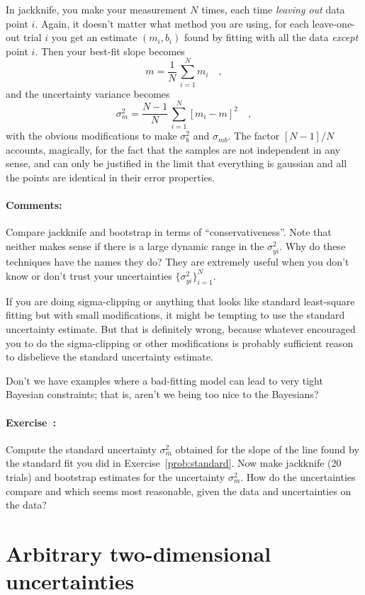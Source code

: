 \documentclass[12pt]{article}
\newcommand{\problemname}{Exercise}
\newcommand{\commentsname}{Comments}
\newcounter{problem}
\newenvironment{problem}{\paragraph{\problemname~\theproblem:}\refstepcounter{problem}}{}
\newenvironment{comments}{\paragraph{\commentsname:}}{}
\newcommand{\setofall}[3]{\{{#1}\}_{{#2}}^{{#3}}}
\newcommand{\allsigmay}{\setofall{\sigma_{yi}^2}{i=1}{N}}
\begin{document}
In jackknife, you make your measurement $N$ times, each time
\emph{leaving out} data point $i$.  Again, it doesn't matter what
method you are using, for each leave-one-out trial $i$ you get an
estimate $(m_i,b_i)$ found by fitting with all the data \emph{except}
point $i$.  Then your best-fit slope becomes
\begin{equation}
m = \frac{1}{N}\,\sum_{i=1}^N m_i \quad ,
\end{equation}
and the uncertainty variance becomes
\begin{equation}
\sigma_m^2 = \frac{N-1}{N}\,\sum_{i=1}^N [m_i-m]^2 \quad ,
\end{equation}
with the obvious modifications to make $\sigma_b^2$ and
$\sigma_{mb}$.  The factor $[N-1]/N$ accounts, magically, for the
fact that the samples are not independent in any sense, and can only
be justified in the limit that everything is gaussian and all the
points are identical in their error properties.

\begin{comments}
Compare jackknife and bootstrap in terms of ``conservativeness''.
Note that neither makes sense if there is a large dynamic range in the
$\sigma_{yi}^2$.  Why do these techniques have the names they do?
They are extremely useful when you don't know or don't trust your
uncertainties $\allsigmay$.

If you are doing sigma-clipping or anything that looks like standard
least-square fitting but with small modifications, it might be
tempting to use the standard uncertainty estimate.  But that is
definitely wrong, because whatever encouraged you to do the
sigma-clipping or other modifications is probably sufficient reason to
disbelieve the standard uncertainty estimate.

Don't we have examples where a bad-fitting model can lead to very
tight Bayesian constraints; that is, aren't we being too nice to the
Bayesians?
\end{comments}

\begin{problem}
Compute the standard uncertainty $\sigma_m^2$ obtained for the slope
of the line found by the standard fit you did in
\problemname~\ref{prob:standard}.  Now make jackknife (20 trials) and
bootstrap estimates for the uncertainty $\sigma_m^2$.  How do the
uncertainties compare and which seems most reasonable, given the data
and uncertainties on the data?
\end{problem}

\section{Arbitrary two-dimensional uncertainties}\label{sec:twod}
\end{document}
